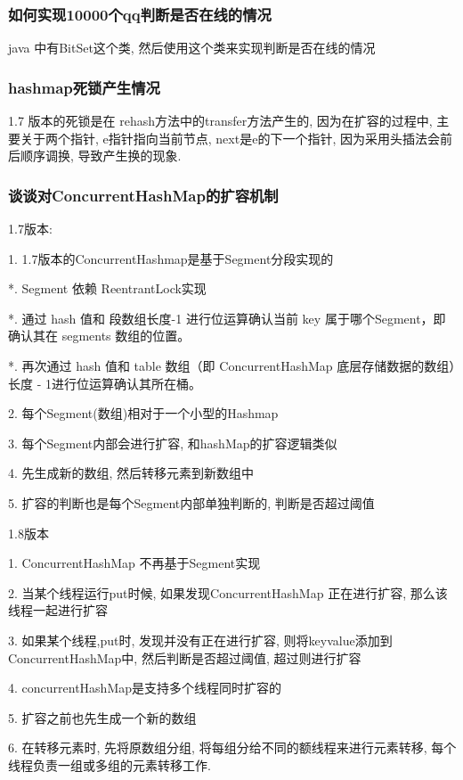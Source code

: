 \subsubsection{如何实现10000个qq判断是否在线的情况}
java 中有BitSet这个类, 然后使用这个类来实现判断是否在线的情况 \par
\subsubsection{hashmap死锁产生情况}
1.7 版本的死锁是在 rehash方法中的transfer方法产生的, 因为在扩容的过程中, 主要关于两个指针, e指针指向当前节点, next是e的下一个指针, 因为采用头插法会前后顺序调换, 导致产生换的现象. \par
\subsubsection{谈谈对ConcurrentHashMap的扩容机制}
1.7版本: \par
1. 1.7版本的ConcurrentHashmap是基于Segment分段实现的\par
*. Segment 依赖 ReentrantLock实现 \par
*. 通过 hash 值和 段数组长度-1 进行位运算确认当前 key 属于哪个Segment，即确认其在 segments 数组的位置。\par
*. 再次通过 hash 值和 table 数组（即 ConcurrentHashMap 底层存储数据的数组）长度 - 1进行位运算确认其所在桶。\par


2. 每个Segment(数组)相对于一个小型的Hashmap \par
3. 每个Segment内部会进行扩容, 和hashMap的扩容逻辑类似 \par
4. 先生成新的数组, 然后转移元素到新数组中 \par
5. 扩容的判断也是每个Segment内部单独判断的, 判断是否超过阈值 \par
1.8版本 \par
1. ConcurrentHashMap 不再基于Segment实现 \par
2. 当某个线程运行put时候, 如果发现ConcurrentHashMap 正在进行扩容, 那么该线程一起进行扩容 \par
3. 如果某个线程,put时, 发现并没有正在进行扩容, 则将keyvalue添加到ConcurrentHashMap中, 然后判断是否超过阈值, 超过则进行扩容 \par
4. concurrentHashMap是支持多个线程同时扩容的 \par
5. 扩容之前也先生成一个新的数组 \par
6. 在转移元素时, 先将原数组分组, 将每组分给不同的额线程来进行元素转移, 每个线程负责一组或多组的元素转移工作. \par

